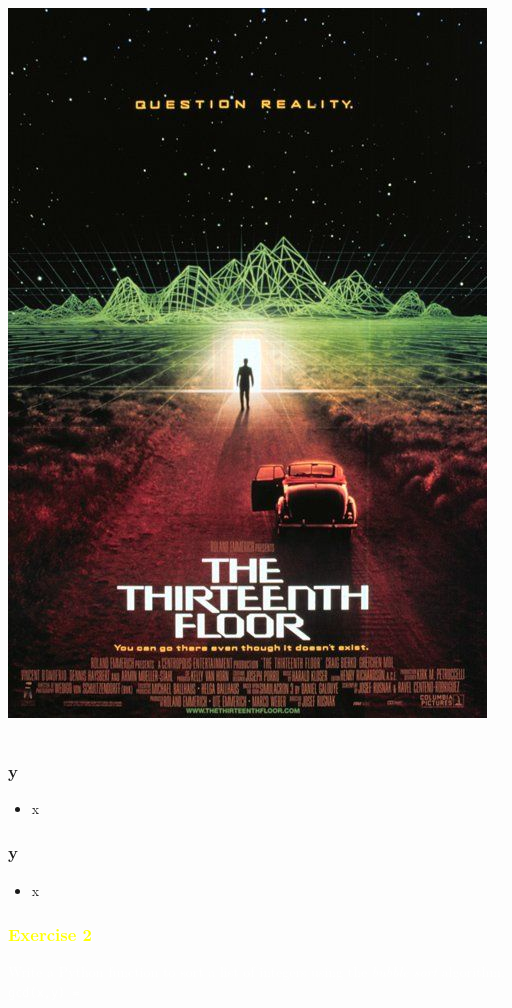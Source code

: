 \documentclass[xcolor=table,10pt,final]{beamer}
\begin{document}
\begin{frame}
\begin{columns}[t,totalwidth=\textwidth]
\begin{column}{.3\linewidth}
			\includegraphics[scale=0.14]{floor}			
		\end{column}
	\end{columns}
\end{frame}

\begin{frame}
	\frametitle{y}
	\begin{itemize}
		\item x
	\end{itemize}
\end{frame}

\begin{frame}
	\frametitle{y}
	\begin{itemize}
		\item x
	\end{itemize}
\end{frame}

{
\begin{frame}
	\frametitle{\textcolor{yellow}{Exercise 2}}
	\textcolor{white}{Write a Python function to sort a list of integers using the \emph{bubble sort} algorithm.\newline\newline
	 {\tt gcd(x,y) = }
	}
\end{frame}
}
\end{document}
